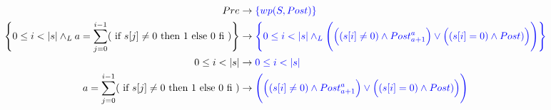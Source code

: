 \documentclass[a4paper]{article}
\begin{document}
\begin{enumerate}
		\begin{align*}
		Pre &\rightarrow \color{blue}\{wp(S,Post)\}\\
		\Bigg\{0 \leq i < |s| \wedge_L a=\sum_{j=0}^{i-1}(\textrm{ if }s[j] \neq 0 
    \textrm{ then 1 else 0 fi })\Bigg\} &\rightarrow  \color{blue}\Bigg\{0\leq i<|s|\wedge_L 
   			\Bigg(\Big((s[i]\neq 0)\wedge
   				Post_{a+1}^{a}\Big) \vee \Big((s[i] = 0)\wedge Post)\Big)\Bigg)\Bigg\}\\
   			0 \leq i < |s| &\rightarrow \color{blue} 0\leq i<|s|\\
   			a=\sum_{j=0}^{i-1}(\textrm{ if }s[j] \neq 0 
    \textrm{ then 1 else 0 fi }) &\rightarrow \color{blue} \Bigg(\Big((s[i]\neq 0)\wedge
   				Post_{a+1}^{a}\Big) \vee \Big((s[i] = 0)\wedge Post)\Big)\Bigg)
		\end{align*}
\end{enumerate}
\end{document}
